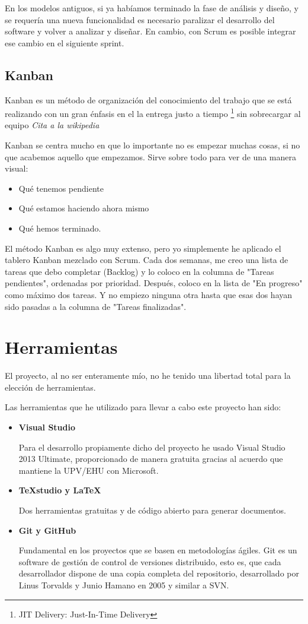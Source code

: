 En los modelos antiguos, si ya habíamos terminado la fase de análisis y diseño, y se requería una nueva funcionalidad es necesario paralizar el desarrollo del software y volver a analizar y diseñar. En cambio, con Scrum es posible integrar ese cambio en el siguiente sprint.

\subsection{Kanban}
Kanban es un método de organización del conocimiento del trabajo que se está realizando con un gran énfasis en el la entrega justo a tiempo \footnote{JIT Delivery: Just-In-Time Delivery} sin sobrecargar al equipo \emph{Cita a la wikipedia}

Kanban se centra mucho en que lo importante no es empezar muchas cosas, si no que acabemos aquello que empezamos. Sirve sobre todo para ver de una manera visual:
\begin{itemize}
    \item Qué tenemos pendiente
    \item Qué estamos haciendo ahora mismo
    \item Qué hemos terminado.
\end{itemize}

El método Kanban es algo muy extenso, pero yo simplemente he aplicado el tablero Kanban mezclado con Scrum. Cada dos semanas, me creo una lista de tareas que debo completar (Backlog) y lo coloco en la columna de "Tareas pendientes", ordenadas por prioridad. Después, coloco en la lista de "En progreso" como máximo dos tareas. Y no empiezo ninguna otra hasta que esas dos hayan sido pasadas a la columna de "Tareas finalizadas".

\section{Herramientas}
El proyecto, al no ser enteramente mío, no he tenido una libertad total para la elección de herramientas. 

Las herramientas que he utilizado para llevar a cabo este proyecto han sido:
\begin{itemize}
    \item 
    \textbf{Visual Studio}
    
    Para el desarrollo propiamente dicho del proyecto he usado Visual Studio 2013 Ultimate, proporcionado de manera gratuita gracias al acuerdo que mantiene la UPV/EHU con Microsoft.
    
    \item 
    \textbf{TeXstudio y \LaTeX}
    
    Dos herramientas gratuitas y de código abierto para generar documentos.
    
    \item
    \textbf{Git y GitHub}
    
    Fundamental en los proyectos que se basen en metodologías ágiles. Git es un software de gestión de control de versiones distribuido, esto es, que cada desarrollador dispone de una copia completa del repositorio, desarrollado por Linus Torvalds y Junio Hamano en 2005 y similar a SVN.
\end{itemize}

